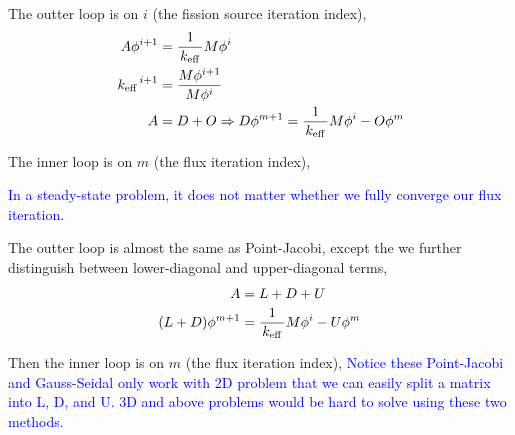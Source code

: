 \documentclass{school-22.211-notes}
\begin{document}
The outter loop is on $i$ (the fission source iteration index), 
\begin{align}
A \phi^{i+1} &= \frac{1}{\left. k_{\mathrm{eff}} \right.} M \phi^i \\
\left. k_{\mathrm{eff}} \right.^{i+1} &= \frac{M \phi^{i+1}}{M \phi^i} \\
A &= D + O \Rightarrow D \phi^{m+1} = \frac{1}{\left. k_{\mathrm{eff}} \right.} M \phi^i - O \phi^m 
\end{align}

The inner loop is on $m$ (the flux iteration index), 

\textcolor{blue}{In a steady-state problem, it does not matter whether we fully converge our flux iteration.} 


The outter loop is almost the same as Point-Jacobi, except the we further distinguish between lower-diagonal and upper-diagonal terms, 
\begin{align}
A &= L + D + U  \\
(L + D ) \phi^{m+1} &= \frac{1}{\left. k_{\mathrm{eff}} \right.} M \phi^i - U \phi^m 
\end{align}

Then the inner loop is on $m$ (the flux iteration index), 
\textcolor{blue}{Notice these Point-Jacobi and Gauss-Seidal only work with 2D problem that we can easily split a matrix into L, D, and U. 3D and above problems would be hard to solve using these two methods.} 
\end{document}
